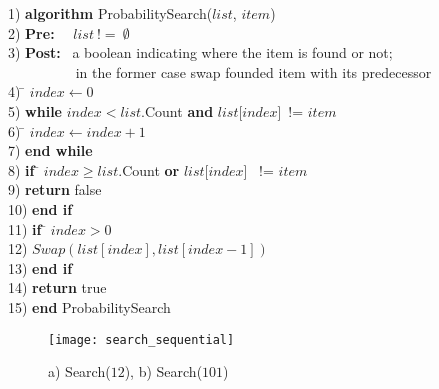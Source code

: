 \newpage
\begin{tabbing}
1) \textbf{alg}\= \textbf{orithm} ProbabilitySearch($list$, $item$)\\
2) \> \textbf{Pre:}~~ $list~!=~\emptyset$ \\
3) \> \textbf{Post:}~ a boolean indicating where the item is found or not;\\
   \>~~~~~~~~~ in the former case swap founded item with its predecessor \\
4) \> \= $index \leftarrow 0$ \\
5) \> \textbf{whi}\= \textbf{le} $index < list$.Count  \textbf{and} $list$[$index$]~!= $item$ \\
6) \> \> \= $index \leftarrow index+1$ \\
7) \> \textbf{end while} \\
8) \> \textbf{if }\= $ index \geq list$.Count  \textbf{or} $list$[$index$] ~!= $item$ \\
9) \> \> \textbf{return} false \\
10)\> \textbf{end if} \\
11)\> \textbf{if }\= $ index > 0$ \\
12)\> \> $Swap(list[index], list[index-1])$ \\
13)\> \textbf{end if } \\
14)\> \textbf{return} true \\ 
15) \textbf{end} ProbabilitySearch \\
\end {tabbing}

\begin{figure}
\begin{center}
\texttt{[image: search\_sequential]}
\end{center}
\caption{a) Search($12$), b) Search($101$)} \label{fig:search_seq}
\end{figure}
